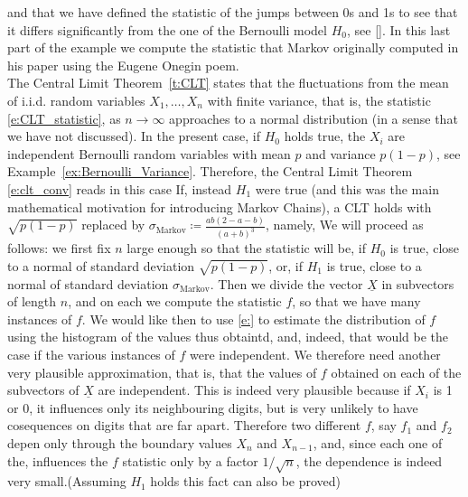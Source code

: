 	and that we have defined the statistic of the jumps between 0s and 1s to see that it differs significantly from the one of the Bernoulli model $H_0$, see \eqref{}. 
	In this last part of the example we compute the statistic that Markov originally computed in his paper \cite{Markov} using the Eugene Onegin poem.   \\
	The Central Limit Theorem~\ref{t:CLT} states that the fluctuations from the mean of i.i.d. random variables $X_1, \ldots, X_n$ with finite variance, that is, the statistic \eqref{e:CLT_statistic}, as $n\to \infty$ approaches to a normal distribution (in a sense that we have not discussed). In the present case, if $H_0$ holds true, the $X_i$ are independent Bernoulli random variables with mean $p$ and variance  $p(1-p)$,  see Example~\ref{ex:Bernoulli_Variance}. Therefore, the Central Limit Theorem \eqref{e:clt_conv} reads in this case  
	If, instead $H_1$ were true (and this was the main mathematical motivation for introducing Markov Chains), a CLT  holds with $\sqrt{p(1-p)}$ replaced by $\sigma_\text{Markov}\coloneq \frac{ab(2- a - b) }{(a + b )^3}$, namely, 
	We will proceed as follows: we first fix $n$ large enough so that the statistic 
	will be, if $H_0$ is true, close to a normal of standard deviation $\sqrt{p(1-p)}$, or, if $H_1$ is true, close to a normal of standard deviation $\sigma_\text{Markov}$. Then we divide the vector $\underline X $ in subvectors of  length $n$, and on each we compute the statistic $f$, so that we have many instances of $f$. We would like then to use \eqref{e:} to estimate the distribution of $f$ using the histogram of the values thus obtaintd, and, indeed, that would be the case if the various instances of $f$ were independent. We therefore need another very plausible approximation, that is, that the values of $f$ obtained on each of the subvectors of $\underline X$ are independent. This is indeed very plausible because if $X_i$ is 1 or 0, it influences only its neighbouring digits, but is very unlikely to have cosequences on digits that are far apart. Therefore two different $f$, say $f_1$ and $f_2$ depen only through the boundary values $X_n$ and $X_{n-1}$, and, since each one of the, influences the $f$ statistic only by a factor $1/\sqrt{n}$, the dependence is indeed very small.(Assuming $H_1$ holds this fact can also be proved)

